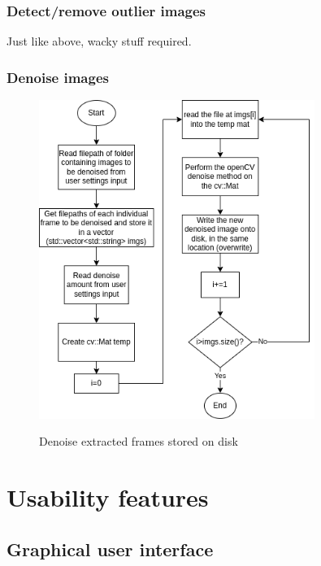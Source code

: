 \documentclass[11pt]{report}
\begin{document}
\subsubsection{Detect/remove outlier images}
Just like above, wacky stuff required.
\subsubsection{Denoise images}
\begin{figure}[h!]
	\centering
	\caption{Denoise extracted frames stored on disk}
	\includegraphics[width=0.8\textwidth]{designDiagrams/denoiseImages}
	\label{fig:denoiseImages}
\end{figure}

\section{Usability features}
\subsection{Graphical user interface}
\end{document}
